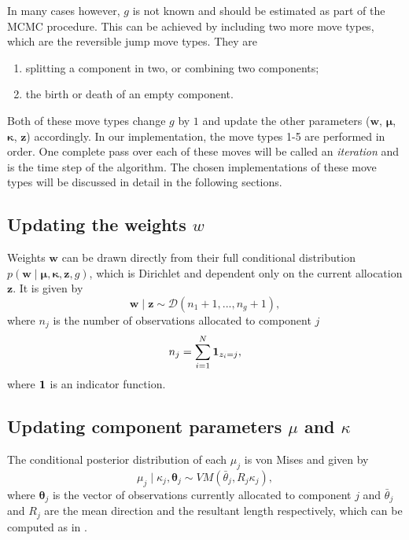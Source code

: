 In many cases however, $g$ is not known and should be estimated as part of the MCMC procedure. This can be achieved by including two more move types, which are the reversible jump move types. They are
\begin{enumerate}
	\setcounter{enumi}{\theenumTemp}
	\item splitting a component in two, or combining two components;
	\item the birth or death of an empty component.
\end{enumerate}
Both of these move types change $g$ by $1$ and update the other parameters ($\bm w$, $\bm \mu$, $\bm \kappa$, $\bm z$) accordingly. In our implementation, the move types 1-5 are performed in order. One complete pass over each of these moves will be called an \emph{iteration} and is the time step of the algorithm. The chosen implementations of these move types will be discussed in detail in the following sections.

\subsection{Updating the weights $w$}
Weights $\bm{w}$ can be drawn directly from their full conditional distribution $p(\bm{w}\mid\bm\mu,\bm\kappa,\bm{z}, g)$, which is Dirichlet and dependent only on the current allocation $\bm z$. It is given by
\begin{equation}
\bm{w}\mid\bm{z} \sim \mathcal{D}(n_1 + 1, ..., n_g + 1),
\end{equation}
where $n_j$ is the number of observations allocated to component $j$
\begin{equation}
n_j = \sum_{i=1}^N \mathbbm{1}_{z_i = j},
\end{equation}
where $\mathbbm{1}$ is an indicator function.

\subsection{Updating component parameters $\mu$ and $\kappa$}

The conditional posterior distribution of each $\mu_j$ is von Mises and given by
\begin{equation}
\mu_j \mid \kappa_j, \bm{\theta}_j \sim VM\left(\bar{\theta}_j, R_{j} \kappa_j\right),
\end{equation}
where $\bm{\theta}_j$ is the vector of observations currently allocated to component $j$ and $\bar{\theta}_j$ and $R_{j}$ are the mean direction and the resultant length respectively, which can be computed as in \citep[p. 15]{Mardia2009}.

